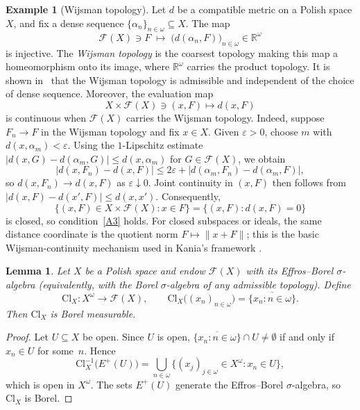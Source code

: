 \documentclass[12pt]{amsart}
\renewcommand{\le}{\leqslant}
\theoremstyle{plain}
\newtheorem{lemma}[theorem]{Lemma}
\theoremstyle{definition}
\newtheorem{example}[theorem]{Example}
\theoremstyle{remark}
\newcommand{\R}{\mathbb{R}}
\begin{document}
\begin{example}[Wijsman topology]\label{ex:wijsman}
Let $d$ be a compatible metric on a Polish space $X$, and fix a dense sequence
$\{\alpha_n\}_{n \in \omega} \subseteq X$.  The map
\[
    \mathcal{F}(X) \ni F \;\longmapsto\; \bigl(d(\alpha_n, F)\bigr)_{n \in \omega}
    \in \R^\omega
\]
is injective.  The \emph{Wijsman topology} is the coarsest topology making this
map a homeomorphism onto its image, where $\R^\omega$ carries the product
topology.  It is shown in~\cite{God2018Cod} that the Wijsman topology is
admissible and independent of the choice of dense sequence.  Moreover, the
evaluation map
\[
    X \times \mathcal{F}(X) \ni (x, F) \longmapsto d(x, F)
\]
is continuous when $\mathcal{F}(X)$ carries the Wijsman topology.  Indeed,
suppose $F_n \to F$ in the Wijsman topology and fix $x \in X$.  Given
$\varepsilon > 0$, choose $m$ with $d(x, \alpha_m) < \varepsilon$.  Using the
$1$-Lipschitz estimate $\lvert d(x, G) - d(\alpha_m, G) \rvert \le d(x, \alpha_m)$
for $G \in \mathcal{F}(X)$, we obtain
\[
    \lvert d(x, F_n) - d(x, F) \rvert
    \le 2\varepsilon + \lvert d(\alpha_m, F_n) - d(\alpha_m, F) \rvert,
\]
so $d(x, F_n) \to d(x, F)$ as $\varepsilon \downarrow 0$.  Joint continuity in
$(x, F)$ then follows from $\lvert d(x, F) - d(x', F) \rvert \le d(x, x')$.
Consequently,
\[
    \{(x, F) \in X \times \mathcal{F}(X) \colon x \in F\}
    = \{(x, F) \colon d(x, F) = 0\}
\]
is closed, so condition~\ref{A3} holds.  For closed subspaces or ideals, the
same distance coordinate is the quotient norm \(F\mapsto\|x+F\|\); this is the
basic Wijsman-continuity mechanism used in Kania's framework
\cite[Lemma~3.8]{Kan2026Pol}.
\end{example}

\begin{lemma}\label{lem:closure-map-borel}
Let $X$ be a Polish space and endow $\mathcal{F}(X)$ with its Effros--Borel
$\sigma$-algebra (equivalently, with the Borel $\sigma$-algebra of any admissible
topology).  Define
\[
    \mathrm{Cl}_X \colon X^\omega \to \mathcal{F}(X), \qquad
    \mathrm{Cl}_X\bigl((x_n)_{n \in \omega}\bigr)
    = \overline{\{x_n \colon n \in \omega\}}.
\]
Then $\mathrm{Cl}_X$ is Borel measurable.
\end{lemma}

\begin{proof}
Let $U \subseteq X$ be open.  Since $U$ is open,
$\overline{\{x_n \colon n \in \omega\}} \cap U \ne \emptyset$ if and only if
$x_n \in U$ for some~$n$.  Hence
\[
    \mathrm{Cl}_X^{-1}\bigl(E^+(U)\bigr)
    = \bigcup_{n \in \omega}
      \bigl\{(x_j)_{j \in \omega} \in X^\omega \colon x_n \in U\bigr\},
\]
which is open in $X^\omega$.  The sets $E^+(U)$ generate the Effros--Borel
$\sigma$-algebra, so $\mathrm{Cl}_X$ is Borel.
\end{proof}
\end{document}
